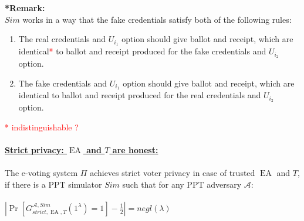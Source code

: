 \documentclass[12pt]{article}
\DeclareMathOperator{\ea}{EA}
\begin{document}
\textbf{*Remark:}\\
$Sim$ works in a way that the fake credentials satisfy both of the following rules: 
\begin{enumerate}
 \item The real credentials and $U_{i_1}$ option  should give ballot and receipt, which are identical\textcolor{red}{*} to ballot and receipt produced for the fake credentials and  $U_{i_2}$ option.
 \item The fake credentials and $U_{i_1}$ option  should give ballot and receipt, which are identical to ballot and receipt produced for the real credentials and  $U_{i_2}$ option.
 \end{enumerate}
\textcolor{red}{*  indistinguishable ?}\\\\
\underline{\textbf{Strict privacy: $\ea$ and $T$ are honest:}}\\\\
The e-voting system $\Pi$ achieves strict voter privacy in case of trusted $\ea$ and $T$, if there is a PPT simulator $Sim$ such that for any PPT adversary $\mathcal{A}$:\\\\
 $|\Pr[G_{strict,\ea,T}^{\mathcal{A}, Sim}(1^{\lambda}) = 1]- \frac{1}{2} |= negl(\lambda)$
\end{document}

